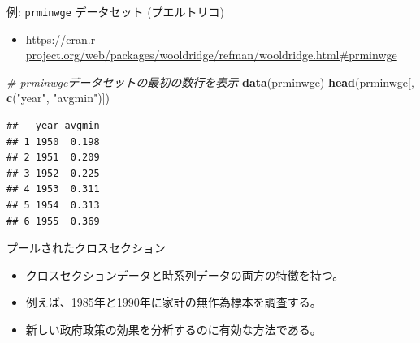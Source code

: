 \documentclass[
  ignorenonframetext,
]{beamer}
\newenvironment{Shaded}{\begin{snugshade}}{\end{snugshade}}
\newcommand{\CommentTok}[1]{\textcolor[rgb]{0.56,0.35,0.01}{\textit{#1}}}
\newcommand{\FunctionTok}[1]{\textcolor[rgb]{0.13,0.29,0.53}{\textbf{#1}}}
\newcommand{\NormalTok}[1]{#1}
\newcommand{\StringTok}[1]{\textcolor[rgb]{0.31,0.60,0.02}{#1}}
\providecommand{\tightlist}{%
  \setlength{\itemsep}{0pt}\setlength{\parskip}{0pt}}
\begin{document}
\begin{frame}[fragile]{例: \texttt{prminwge} データセット
(プエルトリコ)}
\label{ux4f8b-prminwge-ux30c7ux30fcux30bfux30bbux30c3ux30c8-ux30d7ux30a8ux30ebux30c8ux30eaux30b3}
\begin{itemize}
\tightlist
\item
  \url{https://cran.r-project.org/web/packages/wooldridge/refman/wooldridge.html\#prminwge}
\end{itemize}

\begin{Shaded}
\begin{Highlighting}[]
\CommentTok{\# prminwgeデータセットの最初の数行を表示}
\FunctionTok{data}\NormalTok{(prminwge)}
\FunctionTok{head}\NormalTok{(prminwge[, }\FunctionTok{c}\NormalTok{(}\StringTok{"year"}\NormalTok{, }\StringTok{"avgmin"}\NormalTok{)])}
\end{Highlighting}
\end{Shaded}

\begin{verbatim}
##   year avgmin
## 1 1950  0.198
## 2 1951  0.209
## 3 1952  0.225
## 4 1953  0.311
## 5 1954  0.313
## 6 1955  0.369
\end{verbatim}
\end{frame}

\begin{frame}{プールされたクロスセクション}
\label{ux30d7ux30fcux30ebux3055ux308cux305fux30afux30edux30b9ux30bbux30afux30b7ux30e7ux30f3}
\begin{itemize}
\tightlist
\item
  クロスセクションデータと時系列データの両方の特徴を持つ。
\item
  例えば、1985年と1990年に家計の無作為標本を調査する。
\item
  新しい政府政策の効果を分析するのに有効な方法である。
\end{itemize}
\end{frame}
\end{document}
